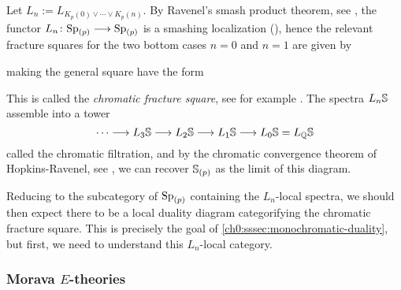 Let $L_n := L_{K_p(0)\vee \cdots \vee K_p(n)}$. By Ravenel's smash product theorem, see \cite[7.5.6]{ravenel_92}, the functor $L_n\colon \sp_{(p)}\longrightarrow \sp_{(p)}$ is a smashing localization (\crefme), hence the relevant fracture squares for the two bottom cases $n=0$ and $n=1$ are given by
\begin{center}
\end{center}
making the general square have the form
\begin{center}
\end{center}
This is called the \emph{chromatic fracture square}, see for example \cite[4.3]{hovey_95}. The spectra $L_n\S$ assemble into a tower 
$$\cdots \longrightarrow L_3\S \longrightarrow L_2\S \longrightarrow L_1\S \longrightarrow L_0 \S = L_\Q\S$$
called the chromatic filtration, and by the chromatic convergence theorem of Hopkins-Ravenel, see \cite[7.5.7]{ravenel_92}, we can recover $\S_{(p)}$ as the limit of this diagram. 


\begin{remark}
    \label{ch0:rm:chromatic-square-from-duality}
    Reducing to the subcategory of $\sp_{(p)}$ containing the $L_n$-local spectra, we should then expect there to be a local duality diagram categorifying the chromatic fracture square. This is precisely the goal of \cref{ch0:sssec:monochromatic-duality}, but first, we need to understand this $L_n$-local category. 
\end{remark}







\subsubsection{Morava \texorpdfstring{$E$}{E}-theories}
\label{ch0:sssec:morava-E-theories}


